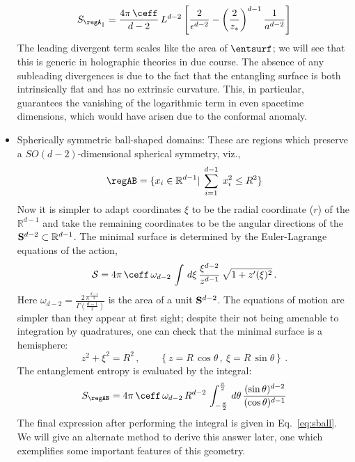 \documentclass[12pt,openany]{book}
\begin{document}
\begin{itemize}
%
\begin{equation}
S_{\regA_{\parallel}} = \frac{4\pi\, \ceff}{d-2} \, L^{d-2}  \left[\frac{2}{\epsilon^{d-2}} -
\left( \frac{2}{z_*}\right)^{d-1} \frac{1}{a^{d-2}} \right]
\label{}
\end{equation}
%
The leading  divergent term scales like the area of $\entsurf$; we will see that this is generic in holographic theories in due course. The absence of any subleading divergences is due to the fact that the entangling surface is both intrinsically flat and has no extrinsic curvature. This, in particular, guarantees the vanishing of the logarithmic term in even spacetime dimensions, which would have arisen due to the conformal anomaly.

\item Spherically symmetric ball-shaped domains: These are regions which preserve a $SO(d-2)$-dimensional spherical symmetry, viz.,
%
\begin{equation}
\regAB = \{x_i \in {\mathbb R}^{d-1}|\; \sum_{i=1}^{d-1} \; x_i^2 \leq R^2 \}
\label{eq:Aball}
\end{equation}
%
Now it is simpler to adapt coordinates $\xi $ to be the radial coordinate ($r$) of the ${\mathbb R}^{d-1}$ and take the remaining coordinates to be the angular directions of the ${\bf S}^{d-2} \subset {\mathbb R}^{d-1}$. The minimal surface is determined by the Euler-Lagrange equations of the action,
%
\begin{equation}
{\cal S}= 4\pi\, \ceff\, \omega_{d-2}\, \int \, d\xi \,
\frac{\xi^{d-2}}{z^{d-1}} \, \sqrt{1+z'(\xi)^2} \,.
\label{}
\end{equation}
%
Here $\omega_{d-2} = \frac{2 \, \pi^\frac{d-1}{2}}{\Gamma\left(\frac{d-1}{2}\right)}$
is the area of a unit ${\bf S}^{d-2}$.
The equations of motion are simpler than they appear at first sight; despite  their not being amenable to integration by quadratures, one can check that the minimal surface is a  hemisphere:
%
\begin{equation}
z^2  + \xi^2 = R^2 \,, \qquad \left\{z = R\, \cos\theta \,,\ \xi = R\, \sin\theta\right\} \,.
\label{eq:rtsphere}
\end{equation}
%
The entanglement entropy is evaluated by the integral:
%
\begin{equation}
S_{\regAB} = 4\pi\, \ceff\, \omega_{d-2}\, R^{d-2}\, \int_{-\frac{\pi}{2}}^{\frac{\pi}{2}} \, d\theta \,
\frac{(\sin\theta)^{d-2}}{(\cos\theta)^{d-1}}
\label{eq:Sdisc1}
\end{equation}
%
The final expression after performing the integral is given in Eq.~\eqref{eq:sball}.
We will give an alternate method to derive this answer later, one which exemplifies some important features of this geometry.
\end{itemize}
\end{document}
